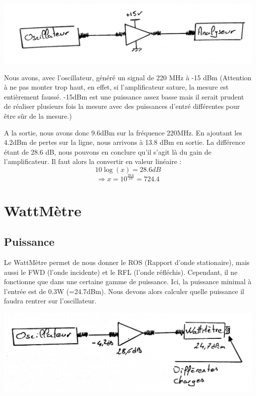 \documentclass[a4paper,12pt]{report}            %
\begin{document}
\begin{center}\includegraphics[scale = 0.3]{pic/montage_ampli.png}\\ \end{center}

Nous avons, avec l'oscillateur, généré un signal de 220 MHz à -15 dBm (Attention à ne pas monter trop haut, en 
effet, si l'amplificateur sature, la mesure est entièrement faussé. -15dBm est une puissance assez basse mais il
serait prudent de réaliser plusieurs fois la mesure avec des puissances d'entré différentes pour être sûr de 
la mesure.)

A la sortie, nous avons donc 9.6dBm sur la fréquence 220MHz. En ajoutant les 4.2dBm de pertes sur la ligne, nous arrivons
à 13.8 dBm en sortie. La différence étant de 28.6 dB, nous pouvons en conclure qu'il s'agit là du gain de l'amplificateur.
Il faut alors la convertir en valeur linéaire :\\
$$10 \log (x) = 28.6 dB$$
$$\Rightarrow x = 10^{\frac{28.6}{10}}=724.4 $$

\chapter{WattMètre}

\section{Puissance}

Le WattMètre permet de nous donner le ROS (Rapport d'onde stationaire), mais aussi le FWD (l'onde incidente) et le
RFL (l'onde réfléchis). Cependant, il ne fonctionne que dans une certaine gamme de puissance. Ici, la puissance minimal
à l'entrée est de 0.3W (=24.7dBm). Nous devons alors calculer quelle puissance il faudra rentrer sur l'oscillateur.

\begin{center}\includegraphics[scale = 0.25]{pic/montage_wattmetre.png}\\ \end{center}
\end{document}
